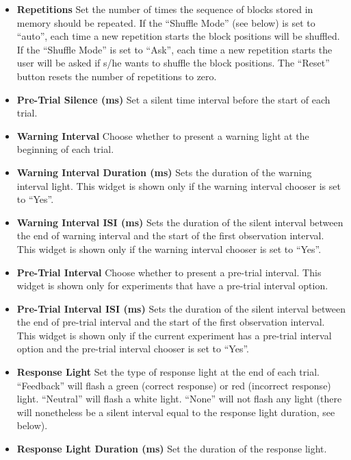 \documentclass[a4paper,12pt,english]{sphinxmanual}
\begin{document}
\begin{itemize}
\item {} 
\textbf{Repetitions} Set the number of times the sequence of blocks stored
in memory should be repeated. If the “Shuffle Mode” (see below) is
set to “auto”, each time a new repetition starts the block positions
will be shuffled. If the “Shuffle Mode” is set to “Ask”, each time a
new repetition starts the user will be asked if s/he wants to shuffle
the block positions. The “Reset” button resets the number of
repetitions to zero.

\item {} 
\textbf{Pre-Trial Silence (ms)} Set a silent time interval before the
start of each trial.

\item {} 
\textbf{Warning Interval} Choose whether to present a warning light at the
beginning of each trial.

\item {} 
\textbf{Warning Interval Duration (ms)} Sets the duration of the warning
interval light. This widget is shown only if the warning interval
chooser is set to “Yes”.

\item {} 
\textbf{Warning Interval ISI (ms)} Sets the duration of the silent
interval between the end of warning interval and the start of the
first observation interval. This widget is shown only if the warning
interval chooser is set to “Yes”.

\item {} 
\textbf{Pre-Trial Interval} Choose whether to present a pre-trial
interval. This widget is shown only for experiments that have a
pre-trial interval option.

\item {} 
\textbf{Pre-Trial Interval ISI (ms)} Sets the duration of the silent
interval between the end of pre-trial interval and the start of the
first observation interval. This widget is shown only if the current
experiment has a pre-trial interval option and the pre-trial interval
chooser is set to “Yes”.

\item {} 
\textbf{Response Light} Set the type of response light at the end of each
trial. ``Feedback'' will flash a green (correct response) or red
(incorrect response) light. ``Neutral'' will flash a white light.
``None'' will not flash any light (there will nonetheless be a silent
interval equal to the response light duration, see below).

\item {} 
\textbf{Response Light Duration (ms)} Set the duration of the response
light.


\end{itemize}
\end{document}
